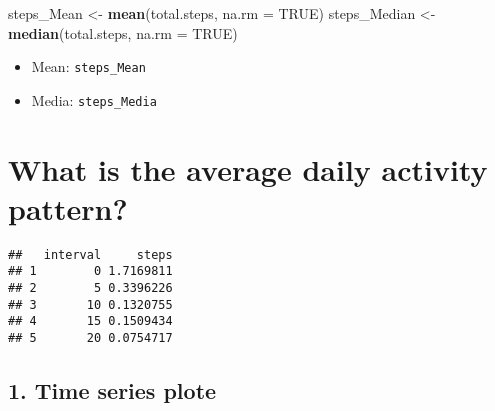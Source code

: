 \documentclass[
]{article}
\newenvironment{Shaded}{\begin{snugshade}}{\end{snugshade}}
\newcommand{\DataTypeTok}[1]{\textcolor[rgb]{0.13,0.29,0.53}{#1}}
\newcommand{\DecValTok}[1]{\textcolor[rgb]{0.00,0.00,0.81}{#1}}
\newcommand{\KeywordTok}[1]{\textcolor[rgb]{0.13,0.29,0.53}{\textbf{#1}}}
\newcommand{\NormalTok}[1]{#1}
\newcommand{\OperatorTok}[1]{\textcolor[rgb]{0.81,0.36,0.00}{\textbf{#1}}}
\newcommand{\OtherTok}[1]{\textcolor[rgb]{0.56,0.35,0.01}{#1}}
\newcommand{\StringTok}[1]{\textcolor[rgb]{0.31,0.60,0.02}{#1}}
\providecommand{\tightlist}{%
  \setlength{\itemsep}{0pt}\setlength{\parskip}{0pt}}
\begin{document}
\begin{Shaded}
\begin{Highlighting}[]
\NormalTok{steps_Mean <-}\StringTok{ }\KeywordTok{mean}\NormalTok{(total.steps, }\DataTypeTok{na.rm =} \OtherTok{TRUE}\NormalTok{)}
\NormalTok{steps_Median <-}\StringTok{ }\KeywordTok{median}\NormalTok{(total.steps, }\DataTypeTok{na.rm =} \OtherTok{TRUE}\NormalTok{)}
\end{Highlighting}
\end{Shaded}

\begin{itemize}
\tightlist
\item
  Mean: \texttt{steps\_Mean}
\item
  Media: \texttt{steps\_Media}
\end{itemize}

\hypertarget{what-is-the-average-daily-activity-pattern}{%
\section{What is the average daily activity
pattern?}\label{what-is-the-average-daily-activity-pattern}}

\begin{Shaded}
\end{Shaded}

\begin{verbatim}
##   interval     steps
## 1        0 1.7169811
## 2        5 0.3396226
## 3       10 0.1320755
## 4       15 0.1509434
## 5       20 0.0754717
\end{verbatim}

\hypertarget{time-series-plote}{%
\subsection{1. Time series plote}\label{time-series-plote}}
\end{document}
